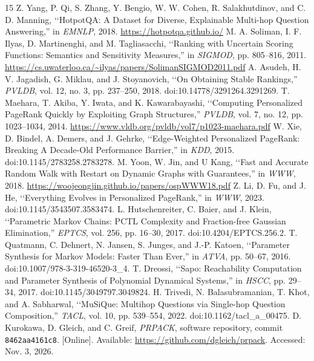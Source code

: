 \documentclass[conference]{IEEEtran}
\begin{document}
\begin{thebibliography}{15}
 Z. Yang, P. Qi, S. Zhang, Y. Bengio, W. W. Cohen, R. Salakhutdinov, and C. D. Manning, \lq\lq HotpotQA: A Dataset for Diverse, Explainable Multi-hop Question Answering,'' in \emph{EMNLP}, 2018. \url{https://hotpotqa.github.io/}
 M. A. Soliman, I. F. Ilyas, D. Martinenghi, and M. Tagliasacchi, \lq\lq Ranking with Uncertain Scoring Functions: Semantics and Sensitivity Measures,'' in \emph{SIGMOD}, pp. 805--816, 2011. \url{https://cs.uwaterloo.ca/~ilyas/papers/SolimanSIGMOD2011.pdf}
 A. Asudeh, H. V. Jagadish, G. Miklau, and J. Stoyanovich, \lq\lq On Obtaining Stable Rankings,'' \emph{PVLDB}, vol. 12, no. 3, pp. 237--250, 2018. doi:10.14778/3291264.3291269.
 T. Maehara, T. Akiba, Y. Iwata, and K. Kawarabayashi, \lq\lq Computing Personalized PageRank Quickly by Exploiting Graph Structures,'' \emph{PVLDB}, vol. 7, no. 12, pp. 1023--1034, 2014. \url{https://www.vldb.org/pvldb/vol7/p1023-maehara.pdf}
 W. Xie, D. Bindel, A. Demers, and J. Gehrke, \lq\lq Edge-Weighted Personalized PageRank: Breaking A Decade-Old Performance Barrier,'' in \emph{KDD}, 2015. doi:10.1145/2783258.2783278.
 M. Yoon, W. Jin, and U Kang, \lq\lq Fast and Accurate Random Walk with Restart on Dynamic Graphs with Guarantees,'' in \emph{WWW}, 2018. \url{https://woojeongjin.github.io/papers/ospWWW18.pdf}
 Z. Li, D. Fu, and J. He, \lq\lq Everything Evolves in Personalized PageRank,'' in \emph{WWW}, 2023. doi:10.1145/3543507.3583474.
 L. Hutschenreiter, C. Baier, and J. Klein, \lq\lq Parametric Markov Chains: PCTL Complexity and Fraction-free Gaussian Elimination,'' \emph{EPTCS}, vol. 256, pp. 16--30, 2017. doi:10.4204/EPTCS.256.2.
 T. Quatmann, C. Dehnert, N. Jansen, S. Junges, and J.-P. Katoen, \lq\lq Parameter Synthesis for Markov Models: Faster Than Ever,'' in \emph{ATVA}, pp. 50--67, 2016. doi:10.1007/978-3-319-46520-3\_4.
 T. Dreossi, \lq\lq Sapo: Reachability Computation and Parameter Synthesis of Polynomial Dynamical Systems,'' in \emph{HSCC}, pp. 29--34, 2017. doi:10.1145/3049797.3049824.
 H. Trivedi, N. Balasubramanian, T. Khot, and A. Sabharwal, \lq\lq MuSiQue: Multihop Questions via Single-hop Question Composition,'' \emph{TACL}, vol. 10, pp. 539--554, 2022. doi:10.1162/tacl\_a\_00475.
 D. Kurokawa, D. Gleich, and C. Greif, \emph{PRPACK}, software repository, commit \texttt{8462aa4161c8}. [Online]. Available: \url{https://github.com/dgleich/prpack}. Accessed: Nov. 3, 2026.

\end{thebibliography}
\end{document}
